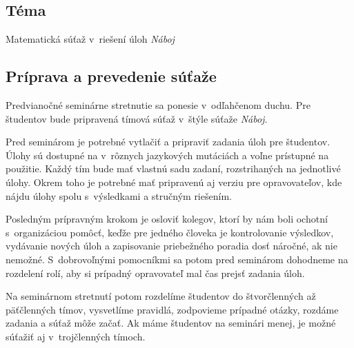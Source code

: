 
\subsection*{Téma}
Matematická súťaž v~riešení úloh \textit{Náboj}

\subsection*{Príprava a prevedenie súťaže}
Predvianočné seminárne stretnutie sa ponesie v~odľahčenom duchu. Pre študentov bude pripravená tímová súťaž v~štýle súťaže \textit{Náboj}.

Pred seminárom je potrebné vytlačiť a pripraviť zadania úloh pre študentov. Úlohy sú dostupné na  v~rôznych jazykových mutáciách a voľne prístupné na použitie. Každý tím bude mať vlastnú sadu zadaní, rozstrihaných na jednotlivé úlohy. Okrem toho je potrebné mať pripravenú aj verziu pre
opravovateľov, kde nájdu úlohy spolu s~výsledkami a stručným riešením.

Posledným prípravným krokom je osloviť kolegov, ktorí by nám boli ochotní s~organizáciou pomôcť, keďže pre jedného človeka je kontrolovanie výsledkov, vydávanie nových úloh a zapisovanie priebežného poradia dosť náročné, ak nie nemožné. S~dobrovoľnými pomocníkmi sa potom pred seminárom dohodneme na rozdelení rolí, aby si prípadný opravovateľ mal čas prejsť zadania úloh.

Na seminárnom stretnutí potom rozdelíme študentov do štvorčlenných až päťčlenných tímov, vysvetlíme pravidlá, zodpovieme prípadné otázky, rozdáme zadania a súťaž môže začať. Ak máme študentov na seminári menej, je možné súťažiť aj v~trojčlenných tímoch.


